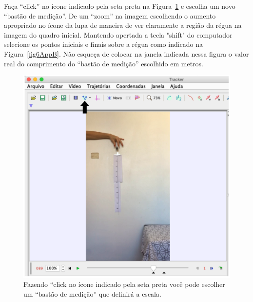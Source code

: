 Faça ``click'' no ícone indicado pela seta preta  na Figura~\ref{fig5AppB} e escolha um novo 
``bastão de medição''. De um ``zoom'' na imagem escolhendo o aumento apropriado no ícone da lupa
de maneira de ver claramente a região da régua na imagem do quadro inicial.  
Mantendo apertada a tecla "shift" do computador selecione os pontos iniciais e finais sobre a régua
como indicado na Figura~\ref{fig6AppB}. Não esqueça de colocar na janela indicada nessa figura o valor real do comprimento do ``bastão de medição'' escolhido em metros.
  \begin{minipage}{\linewidth}
 \centering
      \begin{minipage}{0.35\linewidth}
          \begin{figure}[H]
              \includegraphics[width=\linewidth]{Figuras_exp3/fig5AppB.pdf}
\caption{\label{fig5AppB} Fazendo ``click no ícone indicado pela seta preta você pode escolher um ``bastão de medição'' que definirá a escala.}
          \end{figure}
      \end{minipage}
      \hspace{0.05\linewidth}
      \begin{minipage}{0.38\linewidth}
          \begin{figure}[H]

\end{figure}
\end{minipage}
\end{minipage}
